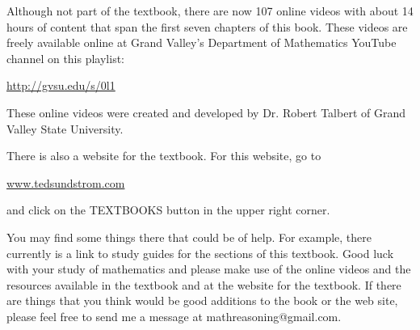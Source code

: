 Although not part of the textbook, there are now 107 online videos with about 14 hours of content that span the first seven chapters of this book. These videos are freely available online at Grand Valley's Department of Mathematics YouTube channel on this playlist: 
 
\begin{center}
\url{http://gvsu.edu/s/0l1}
\end{center}
These online videos were created and developed by Dr. Robert Talbert of Grand Valley State University.

There is also a website for the textbook.  For this website, go to 
\begin{center}
\url{www.tedsundstrom.com}
\end{center}
and click on the TEXTBOOKS button in the upper right corner.

You may find some things there that could be of help.  For example, there currently is a link to study guides for the sections of this textbook.
Good luck with your study of mathematics and please make use of the online videos and the resources available in the textbook and at the website for the textbook.  If there are things that you think would be good additions to the book or the web site, please feel free to send me a message at mathreasoning@gmail.com.




\endinput

